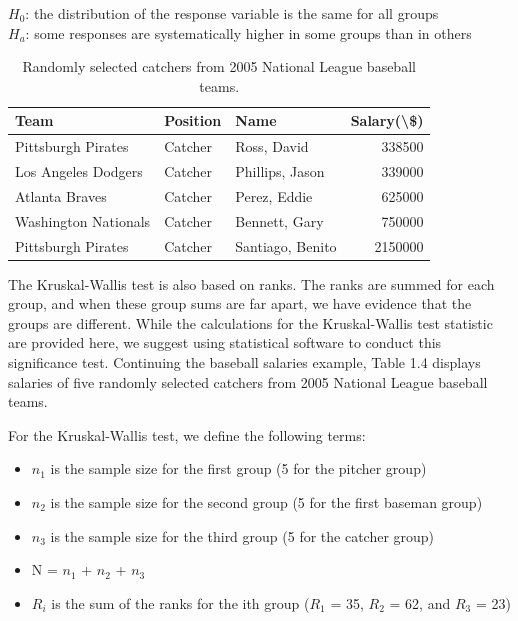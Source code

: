 \documentclass[
]{book}
\providecommand{\tightlist}{%
  \setlength{\itemsep}{0pt}\setlength{\parskip}{0pt}}
\begin{document}
\begin{center}
$H_0$: the distribution of the response variable is the same for all groups\\
$H_a$: some responses are systematically higher in some groups than in others
\end{center}

\begin{table}

\caption{\label{tab:table4}Randomly selected catchers from 2005 National League baseball teams.}
\centering
\begin{tabular}[t]{lllr}
\toprule
Team & Position & Name & Salary(\textbackslash{}\$)\\
\midrule
Pittsburgh Pirates & Catcher & Ross, David & 338500\\
Los Angeles Dodgers & Catcher & Phillips, Jason & 339000\\
Atlanta Braves & Catcher & Perez, Eddie & 625000\\
Washington Nationals & Catcher & Bennett, Gary & 750000\\
Pittsburgh Pirates & Catcher & Santiago, Benito & 2150000\\
\bottomrule
\end{tabular}
\end{table}

The Kruskal-Wallis test is also based on ranks. The ranks are summed for each group, and when these group sums are far apart, we have evidence that the groups are different. While the calculations for the Kruskal-Wallis test statistic are provided here, we suggest using statistical software to conduct this significance test. Continuing the baseball salaries example, Table 1.4 displays salaries of five randomly selected catchers from 2005 National League baseball teams.

For the Kruskal-Wallis test, we define the following terms:

\begin{itemize}
\tightlist
\item
  \(n_1\) is the sample size for the first group (5 for the pitcher group)
\item
  \(n_2\) is the sample size for the second group (5 for the first baseman group)
\item
  \(n_3\) is the sample size for the third group (5 for the catcher group)
\item
  N = \(n_1\) + \(n_2\) + \(n_3\)
\item
  \(R_i\) is the sum of the ranks for the ith group (\(R_1\) = 35, \(R_2\) = 62, and \(R_3\) = 23)
\end{itemize}
\end{document}
